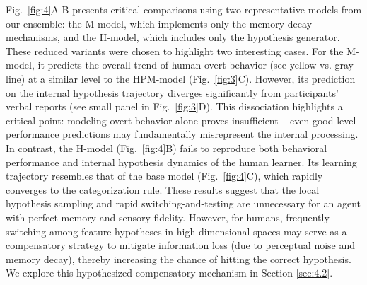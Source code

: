 Fig.~\ref{fig:4}A-B presents critical comparisons using two representative models from our ensemble: the M-model, which implements only the memory decay mechanisms, and the H-model, which includes only the hypothesis generator. These reduced variants were chosen to highlight two interesting cases. For the M-model, it predicts the overall trend of human overt behavior (see yellow vs. gray line) at a similar level to the HPM-model (Fig.~\ref{fig:3}C). However, its prediction on the internal hypothesis trajectory diverges significantly from participants’ verbal reports (see small panel in Fig.~\ref {fig:3}D). This dissociation highlights a critical point: modeling overt behavior alone proves insufficient – even good-level performance predictions may fundamentally misrepresent the internal processing. 
In contrast, the H-model (Fig.~\ref{fig:4}B) fails to reproduce both behavioral performance and internal hypothesis dynamics of the human learner. Its learning trajectory resembles that of the base model (Fig.~\ref{fig:4}C), which rapidly converges to the categorization rule. These results suggest that the local hypothesis sampling and rapid switching-and-testing are unnecessary for an agent with perfect memory and sensory fidelity. However, for humans, frequently switching among feature hypotheses in high-dimensional spaces may serve as a compensatory strategy to mitigate information loss (due to perceptual noise and memory decay), thereby increasing the chance of hitting the correct hypothesis. We explore this hypothesized compensatory mechanism in Section \ref{sec:4.2}. 



